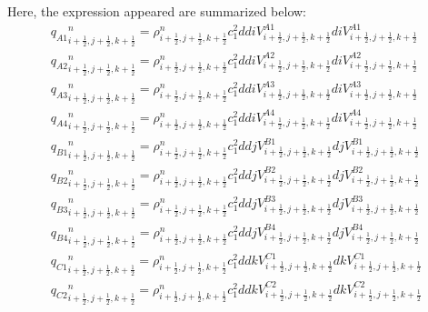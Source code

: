 \begin{enumerate}
	Here, the expression appeared are summarized below: 
	\begin{eqnarray}
		{q_{A1}}^{n}_{i+\frac{1}{2},j+\frac{1}{2},k+\frac{1}{2}}=\rho^{n}_{i+\frac{1}{2},j+\frac{1}{2},k+\frac{1}{2}}c_1^2ddiV^{A1}_{i+\frac{1}{2},j+\frac{1}{2},k+\frac{1}{2}}diV^{A1}_{i+\frac{1}{2},j+\frac{1}{2},k+\frac{1}{2}}\\
		{q_{A2}}^{n}_{i+\frac{1}{2},j+\frac{1}{2},k+\frac{1}{2}}=\rho^{n}_{i+\frac{1}{2},j+\frac{1}{2},k+\frac{1}{2}}c_1^2ddiV^{A2}_{i+\frac{1}{2},j+\frac{1}{2},k+\frac{1}{2}}diV^{A2}_{i+\frac{1}{2},j+\frac{1}{2},k+\frac{1}{2}}\\
		{q_{A3}}^{n}_{i+\frac{1}{2},j+\frac{1}{2},k+\frac{1}{2}}=\rho^{n}_{i+\frac{1}{2},j+\frac{1}{2},k+\frac{1}{2}}c_1^2ddiV^{A3}_{i+\frac{1}{2},j+\frac{1}{2},k+\frac{1}{2}}diV^{A3}_{i+\frac{1}{2},j+\frac{1}{2},k+\frac{1}{2}}\\
		{q_{A4}}^{n}_{i+\frac{1}{2},j+\frac{1}{2},k+\frac{1}{2}}=\rho^{n}_{i+\frac{1}{2},j+\frac{1}{2},k+\frac{1}{2}}c_1^2ddiV^{A4}_{i+\frac{1}{2},j+\frac{1}{2},k+\frac{1}{2}}diV^{A4}_{i+\frac{1}{2},j+\frac{1}{2},k+\frac{1}{2}}\\
		{q_{B1}}^{n}_{i+\frac{1}{2},j+\frac{1}{2},k+\frac{1}{2}}=\rho^{n}_{i+\frac{1}{2},j+\frac{1}{2},k+\frac{1}{2}}c_1^2ddjV^{B1}_{i+\frac{1}{2},j+\frac{1}{2},k+\frac{1}{2}}djV^{B1}_{i+\frac{1}{2},j+\frac{1}{2},k+\frac{1}{2}}\\
		{q_{B2}}^{n}_{i+\frac{1}{2},j+\frac{1}{2},k+\frac{1}{2}}=\rho^{n}_{i+\frac{1}{2},j+\frac{1}{2},k+\frac{1}{2}}c_1^2ddjV^{B2}_{i+\frac{1}{2},j+\frac{1}{2},k+\frac{1}{2}}djV^{B2}_{i+\frac{1}{2},j+\frac{1}{2},k+\frac{1}{2}}\\
		{q_{B3}}^{n}_{i+\frac{1}{2},j+\frac{1}{2},k+\frac{1}{2}}=\rho^{n}_{i+\frac{1}{2},j+\frac{1}{2},k+\frac{1}{2}}c_1^2ddjV^{B3}_{i+\frac{1}{2},j+\frac{1}{2},k+\frac{1}{2}}djV^{B3}_{i+\frac{1}{2},j+\frac{1}{2},k+\frac{1}{2}}\\
		{q_{B4}}^{n}_{i+\frac{1}{2},j+\frac{1}{2},k+\frac{1}{2}}=\rho^{n}_{i+\frac{1}{2},j+\frac{1}{2},k+\frac{1}{2}}c_1^2ddjV^{B4}_{i+\frac{1}{2},j+\frac{1}{2},k+\frac{1}{2}}djV^{B4}_{i+\frac{1}{2},j+\frac{1}{2},k+\frac{1}{2}}\\
		{q_{C1}}^{n}_{i+\frac{1}{2},j+\frac{1}{2},k+\frac{1}{2}}=\rho^{n}_{i+\frac{1}{2},j+\frac{1}{2},k+\frac{1}{2}}c_1^2ddkV^{C1}_{i+\frac{1}{2},j+\frac{1}{2},k+\frac{1}{2}}dkV^{C1}_{i+\frac{1}{2},j+\frac{1}{2},k+\frac{1}{2}}\\
		{q_{C2}}^{n}_{i+\frac{1}{2},j+\frac{1}{2},k+\frac{1}{2}}=\rho^{n}_{i+\frac{1}{2},j+\frac{1}{2},k+\frac{1}{2}}c_1^2ddkV^{C2}_{i+\frac{1}{2},j+\frac{1}{2},k+\frac{1}{2}}dkV^{C2}_{i+\frac{1}{2},j+\frac{1}{2},k+\frac{1}{2}}\\

\end{eqnarray}
\end{enumerate}

